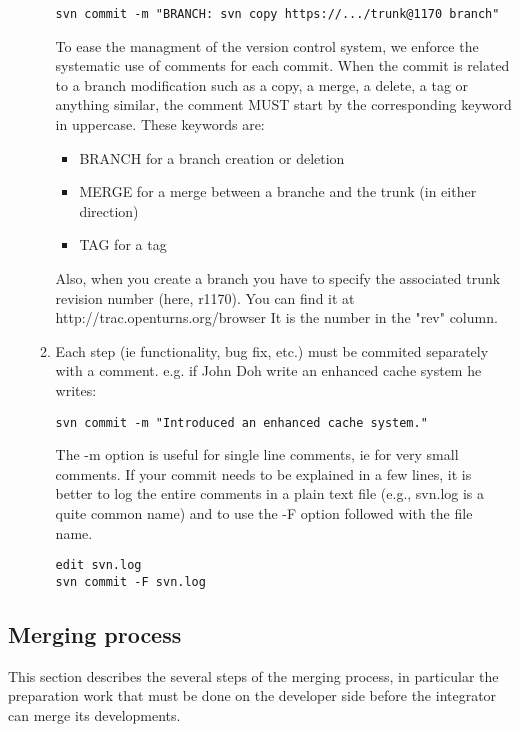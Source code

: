 \documentclass[11pt]{article}
\begin{document}
\begin{itemize}
\begin{enumerate}
\begin{verbatim}
svn commit -m "BRANCH: svn copy https://.../trunk@1170 branch"
\end{verbatim}

    To ease the managment of the version control system, we enforce the systematic use of comments for each commit. When the commit is related to a branch modification such as a copy, a merge, a delete, a tag or anything similar, the comment MUST start by the corresponding keyword in uppercase. These keywords are:

    \begin{itemize}
    \item BRANCH for a branch creation or deletion
    \item MERGE for a merge between a branche and the trunk (in either direction)
    \item TAG for a tag
    \end{itemize}
   Also, when you create a branch you have to specify the associated trunk revision number (here, r1170). You can find it at http://trac.openturns.org/browser
    It is the number in the "rev" column.


  \item Each step (ie functionality, bug fix, etc.) must be commited separately with a comment. e.g. if John Doh write an enhanced cache system he writes:

\begin{verbatim}
svn commit -m "Introduced an enhanced cache system."
\end{verbatim}

    The -m option is useful for single line comments, ie for very small comments. If your commit needs to be explained in a few lines, it is better to log the entire comments in a plain text file (e.g., svn.log is a quite common name) and to use the -F option followed with the file name.
\begin{verbatim}
edit svn.log
svn commit -F svn.log
\end{verbatim}

  \end{enumerate}
\end{itemize}


\subsection{Merging process}

This section describes the several steps of the merging process, in particular the preparation work that must be done on the developer side before the integrator can merge its developments.
\end{document}
